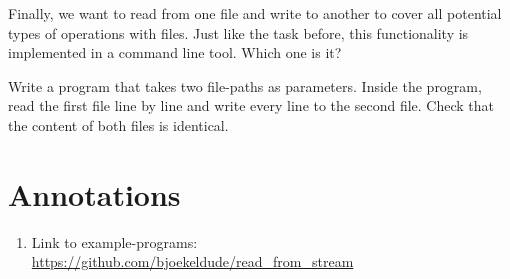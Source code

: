 \documentclass{dcbl/challenge}
\begin{document}
\begin{aufgabe}
    Finally, we want to read from one file and write to another to cover all potential types of operations with files. Just like the task before, this functionality is implemented in a command line tool. Which one is it?
    
    Write a program that takes two file-paths as parameters.
    Inside the program, read the first file line by line and write every line to the second file. Check that the content of both files is identical.
\end{aufgabe}


\section*{Annotations}
\begin{enumerate}
    \item Link to example-programs: \url{https://github.com/bjoekeldude/read_from_stream}
\end{enumerate}
\end{document}
